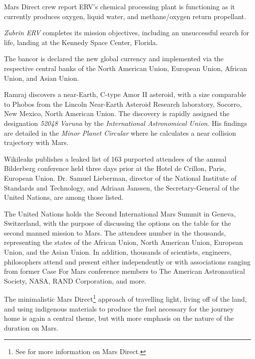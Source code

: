 Mars Direct crew report ERV's chemical processing plant is functioning as it currently produces oxygen, liquid water, and methane/oxygen return propellant.
\StopTimelineDate

{\it Zubrin ERV} completes its mission objectives, including an unsuccessful search for life, landing at the Kennedy Space Center, Florida.
\StopTimelineDate

The bancor is declared the new global currency and implemented via the respective central banks of the North American Union, European Union, African Union, and Asian Union.
\StopTimelineDate

Ramraj discovers a near-Earth, C-type Amor II asteroid, with a size comparable to Phobos from the Lincoln Near-Earth Asteroid Research laboratory, Socorro, New Mexico, North American Union. The discovery is rapidly assigned the designation {\it 52048 Varuna} by the {\it International Astronomical Union}. His findings are detailed in the {\it Minor Planet Circular} where he calculates a near collision trajectory with Mars.
\StopTimelineDate

Wikileaks publishes a leaked list of 163 purported attendees of the annual Bilderberg conference held three days prior at the Hotel de Crillon, Paris, European Union. Dr. Samuel Lieberman, director of the National Institute of Standards and Technology, and Adriaan Janssen, the Secretary-General of the United Nations, are among those listed.
\StopTimelineDate

The United Nations holds the Second International Mars Summit in Geneva, Switzerland, with the purpose of discussing the options on the table for the second manned mission to Mars. The attendees number in the thousands, representing the states of the African Union, North American Union, European Union, and the Asian Union. In addition, thousands of scientists, engineers, philosophers attend and present either independently or with associations ranging from former Case For Mars conference members to The American Astronautical Society, NASA, RAND Corporation, and more.

The minimalistic Mars Direct\footnote{See  for more information on Mars Direct.} approach of travelling light, living off of the land, and using indigenous materials to produce the fuel necessary for the journey home is again a central theme, but with more emphasis on the nature of the duration on Mars.
\StopTimelineDate

